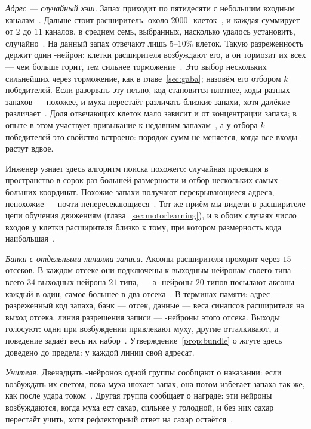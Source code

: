 \emph{Адрес --- случайный хэш.} Запах приходит по пятидесяти с небольшим входным каналам~\cite{Caron2013}. Дальше стоит расширитель: около $2000$ -клеток~\cite{Aso2014}, и каждая суммирует от $2$ до $11$ каналов, в среднем семь, выбранных, насколько удалось установить, случайно~\cite{Caron2013}. На данный запах отвечают лишь $5$--$10\%$ клеток. Такую разреженность держит один -нейрон: клетки расширителя возбуждают его, а он тормозит их всех --- чем больше горит, тем сильнее торможение~\cite{Lin2014}. Это выбор нескольких сильнейших через торможение, как в главе~\ref{sec:gaba}; назовём его отбором $k$ победителей. Если разорвать эту петлю, код становится плотнее, коды разных запахов --- похожее, и муха перестаёт различать близкие запахи, хотя далёкие различает~\cite{Lin2014}. Доля отвечающих клеток мало зависит и от концентрации запаха; в опыте в этом участвует привыкание к недавним запахам~\cite{Honegger2011}, а у отбора $k$ победителей это свойство встроено: порядок сумм не меняется, когда все входы растут вдвое.

Инженер узнает здесь алгоритм поиска похожего: случайная проекция в пространство в сорок раз большей размерности и отбор нескольких самых больших координат. Похожие запахи получают перекрывающиеся адреса, непохожие --- почти непересекающиеся~\cite{Dasgupta2017}. Тот же приём мы видели в расширителе цепи обучения движениям (глава~\ref{sec:motorlearning}), и в обоих случаях число входов у клетки расширителя близко к тому, при котором размерность кода наибольшая~\cite{LitwinKumar2017}.

\emph{Банки с отдельными линиями записи.} Аксоны расширителя проходят через $15$ отсеков. В каждом отсеке они подключены к выходным нейронам своего типа --- всего $34$ выходных нейрона $21$ типа, --- а -нейроны $20$ типов посылают аксоны каждый в один, самое большее в два отсека~\cite{Aso2014,AsoMBON2014}. В терминах памяти: адрес --- разреженный код запаха, банк --- отсек, данные --- веса синапсов расширителя на выход отсека, линия разрешения записи --- -нейроны этого отсека. Выходы голосуют: одни при возбуждении привлекают муху, другие отталкивают, и поведение задаёт весь их набор~\cite{AsoMBON2014}. Утверждение~\ref{prop:bundle} о жгуте здесь доведено до предела: у каждой линии свой адресат.

\emph{Учителя.} Двенадцать -нейронов одной группы сообщают о наказании: если возбуждать их светом, пока муха нюхает запах, она потом избегает запаха так же, как после удара током~\cite{ClaridgeChang2009}. Другая группа сообщает о награде: эти нейроны возбуждаются, когда муха ест сахар, сильнее у голодной, и без них сахар перестаёт учить, хотя рефлекторный ответ на сахар остаётся~\cite{Liu2012}.

